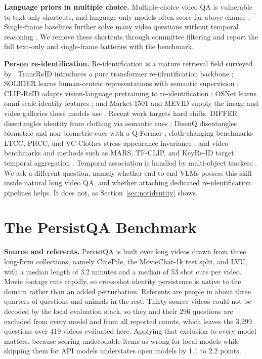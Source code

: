 \documentclass{article}
\newcommand{\bench}{PersistQA}
\newcommand{\numq}{3{,}299}
\newcommand{\numv}{419}
\begin{document}
\textbf{Language priors in multiple choice.} Multiple-choice video QA is vulnerable to text-only shortcuts, and language-only models often score far above chance \citep{goyal2017vqa,vqacp,annotationartifacts,atp,mmstar}. Single-frame baselines further solve many video questions without temporal reasoning \citep{atp}. We remove these shortcuts through committee filtering and report the full text-only and single-frame batteries with the benchmark.

\textbf{Person re-identification.} Re-identification is a mature retrieval field surveyed by \citet{reidsurvey}. TransReID introduces a pure transformer re-identification backbone \citep{transreid}; SOLIDER learns human-centric representations with semantic supervision \citep{solider}; CLIP-ReID adapts vision-language pretraining to re-identification \citep{clipreid}; OSNet learns omni-scale identity features \citep{osnet}; and Market-1501 and MEVID supply the image and video galleries these models use \citep{market1501,mevid}. Recent work targets hard shifts. DIFFER disentangles identity from clothing via semantic cues \citep{differ}; DisenQ disentangles biometric and non-biometric cues with a Q-Former \citep{disenq}; cloth-changing benchmarks LTCC, PRCC, and VC-Clothes stress appearance invariance \citep{ltcc,prcc,vcclothes}; and video benchmarks and methods such as MARS, TF-CLIP, and KeyRe-ID target temporal aggregation \citep{mars,tfclip,keyreid}. Temporal association is handled by multi-object trackers \citep{sort,bytetrack,botsort,deepocsort,strongsort}. We ask a different question, namely whether end-to-end VLMs possess this skill inside natural long video QA, and whether attaching dedicated re-identification pipelines helps. It does not, as Section~\ref{sec:notidentity} shows.

\section{The \bench{} Benchmark}
\label{sec:bench}

\textbf{Source and referents.} \bench{} is built over long videos drawn from three long-form collections, namely CinePile, the MovieChat-1k test split, and LVU, with a median length of 3.2 minutes and a median of 53 shot cuts per video. Movie footage cuts rapidly, so cross-shot identity persistence is native to the domain rather than an added perturbation. Referents are people in about three quarters of questions and animals in the rest. Thirty source videos could not be decoded by the local evaluation stack, so they and their 296 questions are excluded from every model and from all reported counts, which leaves the \numq{} questions over \numv{} videos evaluated here. Applying that exclusion to every model matters, because scoring undecodable items as wrong for local models while skipping them for API models understates open models by 1.1 to 2.2 points.
\end{document}
